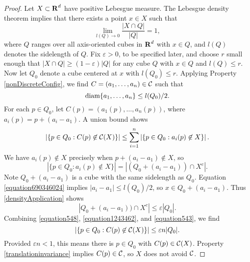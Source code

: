\begin{proof}
	Let $X \subset \operatorname{\mathbf{R}}^d$ have positive Lebesgue measure. The Lebesgue density theorem implies that there exists a point $x \in X$ such that
	\begin{equation} \label{densityApplication} \lim_{l(Q) \to 0} \frac{|X \cap Q|}{|Q|} = 1, \end{equation}
	where $Q$ ranges over all axis-oriented cubes in $\operatorname{\mathbf{R}}^d$ with $x \in Q$, and $l(Q)$ denotes the sidelength of $Q$. Fix $\varepsilon > 0$, to be specified later, and choose $r$ small enough that $|X \cap Q| \geq (1 - \varepsilon) |Q|$ for any cube $Q$ with $x \in Q$ and $l(Q) \leq r$. Now let $Q_0$ denote a cube centered at $x$ with $l(Q_0) \leq r$. Applying Property \ref{nonDiscreteConfig}, we find $C = (a_1, \dots, a_n) \in \operatorname{\mathcal{C}}$ such that
	\begin{equation} \label{equation690346024} \operatorname{\text{diam}} \{ a_1, \dots, a_n \} \leq l(Q_0)/2. \end{equation}
	For each $p \in Q_0$, let $C(p) = (a_1(p), \dots, a_n(p))$, where $a_i(p) = p + (a_i - a_1)$. A union bound shows
	\begin{equation} \label{equation548} \left| \{ p \in Q_0 : C(p) \not \in \operatorname{\mathcal{C}}(X) \} \right| \leq \sum_{i = 1}^n \left| \{ p \in Q_0 : a_i(p) \not \in X \} \right|.
	\end{equation}
	We have $a_i(p) \not \in X$ precisely when $p + (a_i - a_1) \not \in X$, so
	\begin{equation} \label{equation1243462}
		|\{ p \in Q_0 : a_i(p) \not \in X \}| = |(Q_0 + (a_i - a_1)) \cap X^c|.
	\end{equation}
	Note $Q_0 + (a_i - a_1)$ is a cube with the same sidelength as $Q_0$. Equation \eqref{equation690346024} implies $|a_i - a_1| \leq l(Q_0)/2$, so $x \in Q_0 + (a_i - a_1)$. Thus \eqref{densityApplication} shows
	\begin{equation} \label{equation543} |Q_0 + (a_i - a_1)) \cap X^c| \leq \varepsilon |Q_0|. \end{equation}
	Combining \eqref{equation548}, \eqref{equation1243462}, and \eqref{equation543}, we find
	\[ \left| \{ p \in Q_0 : C(p) \not \in \operatorname{\mathcal{C}}(X) \} \right| \leq \varepsilon n |Q_0|. \]
	Provided $\varepsilon n < 1$, this means there is $p \in Q_0$ with $C(p) \in \operatorname{\mathcal{C}}(X)$. Property \ref{translationinvariance} implies $C(p) \in \operatorname{\mathcal{C}}$, so $X$ does not avoid $\operatorname{\mathcal{C}}$.
\end{proof}


